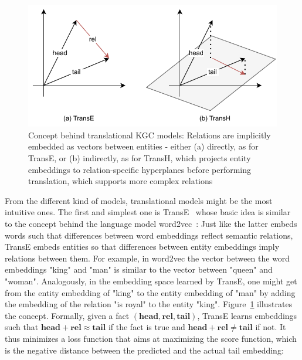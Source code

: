 \begin{figure}[t]
    \centering
    \includegraphics{3_related_work/2_embedding_based/translational}
    \caption{Concept behind translational KGC models: Relations are implicitly embedded as vectors between entities - either (a) directly, as for TransE, or (b) indirectly, as for TransH, which projects entity embeddings to relation-specific hyperplanes before performing translation, which supports more complex relations}
    \label{fig:3_related_work/2_embedding_based/translational}
\end{figure}

From the different kind of models, translational models might be the most intuitive ones. The first and simplest one is TransE~\cite{Bordes2013TranslatingEF} whose basic idea is similar to the concept behind the language model word2vec~\cite{Mikolov2013EfficientEO}: Just like the latter embeds words such that differences between word embeddings reflect semantic relations, TransE embeds entities so that differences between entity embeddings imply relations between them. For example, in word2vec the vector between the word embeddings "king" and "man" is similar to the vector between "queen" and "woman". Analogously, in the embedding space learned by TransE, one might get from the entity embedding of "king" to the entity embedding of "man" by adding the embedding of the relation "is royal" to the entity "king". Figure~\ref{fig:3_related_work/2_embedding_based/translational} illustrates the concept. Formally, given a fact $(\textbf{head}, \textbf{rel}, \textbf{tail})$, TransE learns embeddings such that $\textbf{head} + \textbf{rel} \approx \textbf{tail}$ if the fact is true and $\textbf{head} + \textbf{rel} \neq \textbf{tail}$ if not. It thus minimizes a loss function that aims at maximizing the score function, which is the negative distance between the predicted and the actual tail embedding:

